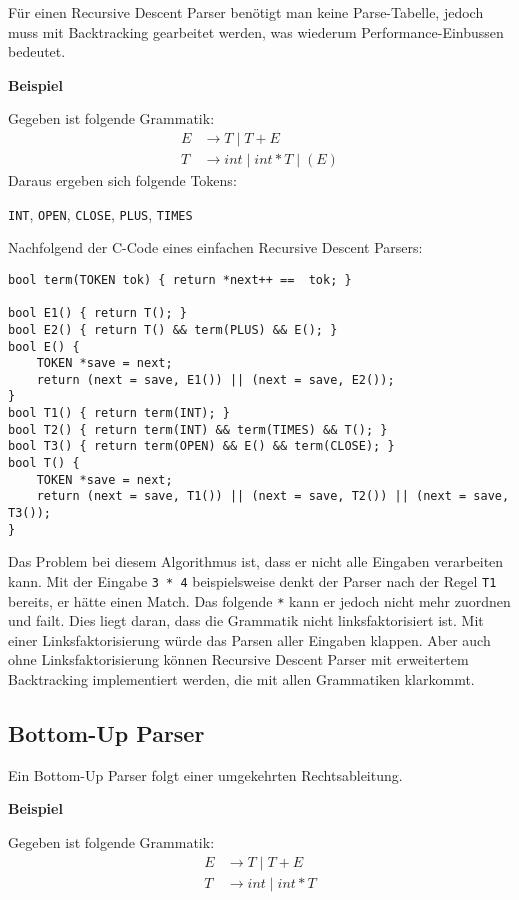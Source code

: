 Für einen Recursive Descent Parser benötigt man keine Parse-Tabelle, jedoch muss
mit Backtracking gearbeitet werden, was wiederum Performance-Einbussen bedeutet.

\textbf{Beispiel}

Gegeben ist folgende Grammatik:
%
\begin{align*}
	E &\rightarrow T \mid T + E \\
	T &\rightarrow int \mid int * T \mid (E)
\end{align*}
%
Daraus ergeben sich folgende Tokens:

\texttt{INT}, \texttt{OPEN}, \texttt{CLOSE}, \texttt{PLUS}, \texttt{TIMES}

Nachfolgend der C-Code eines einfachen Recursive Descent Parsers:

\begin{verbatim}
bool term(TOKEN tok) { return *next++ ==  tok; }

bool E1() { return T(); }
bool E2() { return T() && term(PLUS) && E(); }
bool E() {
    TOKEN *save = next;
    return (next = save, E1()) || (next = save, E2());
}
bool T1() { return term(INT); }
bool T2() { return term(INT) && term(TIMES) && T(); }
bool T3() { return term(OPEN) && E() && term(CLOSE); }
bool T() {
    TOKEN *save = next;
    return (next = save, T1()) || (next = save, T2()) || (next = save, T3());
}
\end{verbatim}

Das Problem bei diesem Algorithmus ist, dass er nicht alle Eingaben verarbeiten
kann. Mit der Eingabe \texttt{3 * 4} beispielsweise denkt der Parser nach der
Regel \texttt{T1} bereits, er hätte einen Match. Das folgende \texttt{*} kann er
jedoch nicht mehr zuordnen und failt. Dies liegt daran, dass die Grammatik nicht
linksfaktorisiert ist. Mit einer Linksfaktorisierung würde das Parsen aller
Eingaben klappen. Aber auch ohne Linksfaktorisierung können Recursive Descent
Parser mit erweitertem Backtracking implementiert werden, die mit allen
Grammatiken klarkommt.


\subsection{Bottom-Up Parser} 

Ein Bottom-Up Parser folgt einer umgekehrten Rechtsableitung.

\textbf{Beispiel}

Gegeben ist folgende Grammatik:
%
\begin{align*}
	E &\rightarrow T \mid T + E \\
	T &\rightarrow int \mid int * T
\end{align*}

